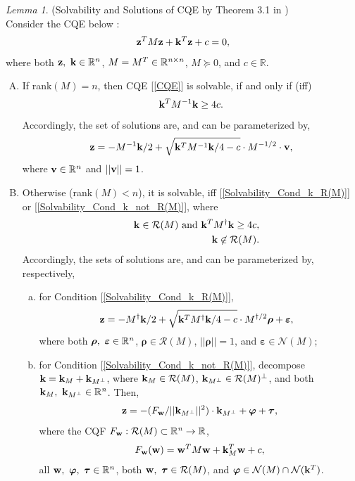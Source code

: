 \documentclass[9pt,twocolumn,twoside,lineno]{pnas-new-1}
\newcommand{\beq}{\begin{eqnarray}}
\newcommand{\eeq}{\end{eqnarray}}
\newcommand{\bfw}{{\bf w}}
\newcommand{\bfk}{{\bf k}}
\newcommand{\bfz}{{\bf z}}
\newcommand{\bfv}{{\bf v}}
\newcommand{\bfrho}{{\boldsymbol \rho}}
\newcommand{\bftau}{{\boldsymbol \tau}}
\newcommand{\bfvarepsilon}{{\boldsymbol \varepsilon}}
\newcommand{\bfvarphi}{{\boldsymbol \varphi}}
\newcommand{\calN}{{\mathcal N}}
\newcommand{\calR}{{\mathcal R}}
\newcommand{\itn}{{\it n}}
\theoremstyle{remark}
\newtheorem{lemma}{Lemma}[section]
\begin{document}
\begin{lemma} (Solvability and Solutions of CQE by Theorem {\rm 3.1} in {\rm \cite{LiLiHs:20}})\\
Consider the CQE below {\rm \citep{Lu(Ye):03(16)}}:
\beq
\bfz^TM\bfz+\bfk^T\bfz+c=0,
\label{CQE}
\eeq
where both $\bfz,~\bfk\in\mathbb{R}^{\it n}$, $M=M^T\in\mathbb{R}^{{\it n}\times {\it n}}$, $M\succeq 0$, and $c\in\mathbb{R}$.
\begin{enumerate}[A)]
\item\label{Lem_Solutions_n} If rank$(M)=n$, then CQE {\rm[\ref{CQE}]} is solvable, if and only if (iff)
    \beq
    \bfk^TM^{-1}\bfk\ge 4c.
    \label{Solvability_Cond_n}
    \eeq
    Accordingly, the set of solutions are, and can be parameterized by,
    \beq
    \bfz=-M^{-1}\bfk/2+\sqrt{\bfk^TM^{-1}\bfk/4-c}\cdot M^{-1/2}\cdot \bfv,
    \label{Solution_n}
    \eeq
    where $\bfv\in\mathbb{R}^{\it n}$ and $||\bfv||=1$.
\item\label{Lem_Solutions_r} Otherwise (rank$(M)<n$), it is solvable, iff {\rm[\ref{Solvability_Cond_k_R(M)}]} or {\rm[\ref{Solvability_Cond_k_not_R(M)}]}, where
    \beq
    &&\bfk\in \calR(M)~\mbox{and}~\bfk^TM^\dagger\bfk\ge 4c,\label{Solvability_Cond_k_R(M)}\\
    &&\bfk\not\in \calR(M).\label{Solvability_Cond_k_not_R(M)}
    \eeq
    Accordingly, the sets of solutions are, and can be parameterized by, respectively,
    \begin{enumerate}[a)]
    \item\label{Lem_Solutions_r_k_R(M)} for Condition {\rm[\ref{Solvability_Cond_k_R(M)}]},
        \beq
        \bfz=-M^\dagger\bfk/2+\sqrt{\bfk^TM^\dagger \bfk/4-c}\cdot M^{\dagger/2}\bfrho+\bfvarepsilon,~~
        \label{Solution_k_R(M)}
        \eeq
        where both $\bfrho,~\bfvarepsilon\in\mathbb{R}^{\it n}$, $\bfrho\in \calR(M)$, $||\bfrho||=1$, and $\bfvarepsilon\in \calN(M)$;
    \item\label{Lem_Solutions_r_k_not_R(M)} for Condition {\rm[\ref{Solvability_Cond_k_not_R(M)}]}, decompose $\bfk=\bfk_M+\bfk_{M^\perp}$, where $\bfk_M\in \calR(M)$, $\bfk_{M^\perp}\in \calR(M)^\perp$, and both $\bfk_M,~\bfk_{M^\perp}\in\mathbb{R}^\itn$. Then,
        \beq
        \bfz=-(F_\bfw/||\bfk_{M^\perp}||^2)\cdot\bfk_{M^\perp}+\bfvarphi+\bftau,
        \label{Solution_k_not_R(M)}
        \eeq
        where the CQF $F_\bfw: \calR(M)\subset\mathbb{R}^\itn\rightarrow\mathbb{R}$,
        \beq
        F_\bfw(\bfw)=\bfw^TM\bfw+\bfk_M^T\bfw+c,
        \label{CQF_Solution_k_not_R(M)}
        \eeq
        all $\bfw,~\bfvarphi,~\bftau\in\mathbb{R}^{\it n}$, both $\bfw,~\bftau\in \calR(M)$, and $\bfvarphi\in \calN(M)\cap \calN(\bfk^T)$.
    \end{enumerate}
\end{enumerate}
\label{Lem_Solutions}
\end{lemma}
\end{document}
